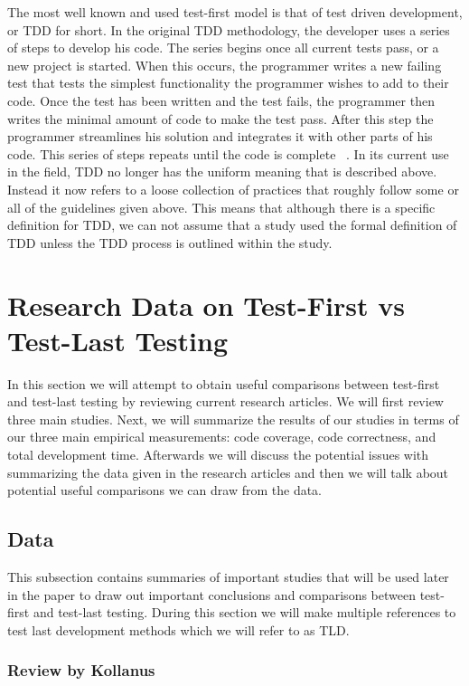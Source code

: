 \documentclass{sig-alternate}
\begin{document}
The most well known and used test-first model is that of test driven development, or TDD for short.  In the original TDD methodology, the developer uses a series of steps to develop his code.  The series begins once all current tests pass, or a new project is started.  When this occurs, the programmer writes a new failing test that tests the simplest functionality the programmer wishes to add to their code.  Once the test has been written and the test fails, the programmer then writes the minimal amount of code to make the test pass.  After this step the programmer streamlines his solution and integrates it with other parts of his code.  This series of steps repeats until the code is complete ~\cite{Hammond:2012}.  In its current use in the field, TDD no longer has the uniform meaning that is described above.  Instead it now refers to a loose collection of practices that roughly follow some or all of the guidelines given above.  This means that although there is a specific definition for TDD, we can not assume that a study used the formal definition of TDD unless the TDD process is outlined within the study. 

\section{Research Data on Test-First vs Test-Last Testing}
In this section we will attempt to obtain useful comparisons between test-first and test-last testing by reviewing current research articles. We will first review three main studies.  Next, we will summarize the results of our studies in terms of our three main empirical measurements: code coverage, code correctness, and total development time.  Afterwards we will discuss the potential issues with summarizing the data given in the research articles and then we will talk about potential useful comparisons we can draw from the data. 

\subsection{Data}

This subsection contains summaries of important studies that will be used later in the paper to draw out important conclusions and comparisons between test-first and test-last testing.  During this section we will make multiple references to test last development methods which we will refer to as TLD.

\subsubsection{Review by Kollanus}
\end{document}
